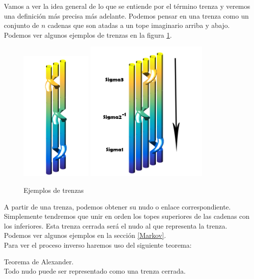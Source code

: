Vamos a ver la idea general de lo que se entiende por el término trenza y veremos una definición más precisa más adelante. Podemos pensar en una trenza como un conjunto de $n$ cadenas que son atadas a un tope imaginario arriba y abajo. Podemos ver algunos ejemplos de trenzas en la figura \ref{ntren1}.\\
   \begin{figure}[h!]
   	\centering
   	\includegraphics[width=3.5cm]{itrenzas/t4.png}
   	\space
   	\includegraphics[width=6cm]{itrenzas/t7.png}
   	\caption{Ejemplos de trenzas}
   	\label{ntren1} 
   \end{figure} 

A partir de una trenza, podemos obtener su nudo o enlace correspondiente. Simplemente tendremos que unir en orden  los topes superiores de las cadenas con los inferiores. Esta trenza cerrada será el nudo al que representa la trenza. Podemos ver algunos ejemplos en la sección \ref{Markov}.\\

Para ver el proceso inverso haremos uso del siguiente teorema:
\begin{teo}Teorema de Alexander.\\
	Todo nudo puede ser representado como una trenza cerrada.
\end{teo}

